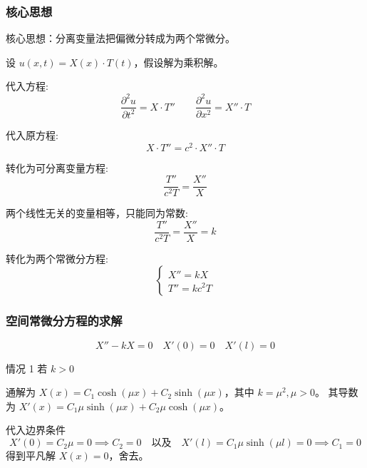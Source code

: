 \documentclass[a4paper, 12pt, oneside]{article} %
\numberwithin{subsection}{section}
\numberwithin{subsubsection}{subsection}
\theoremstyle{plain}
\theoremstyle{definition}
\theoremstyle{remark}
\begin{document}
		\subsubsection{核心思想}
		核心思想：分离变量法把偏微分转成为两个常微分。
		
		设 \(u(x, t) = X(x) \cdot T(t)\)，假设解为乘积解。
		
		代入方程:
		\begin{equation} \label{eq:substitution_neumann}
			\frac{\partial^2 u}{\partial t^2} = X \cdot T'' \qquad \frac{\partial^2 u}{\partial x^2} = X'' \cdot T
		\end{equation}
		
		代入原方程:
		\begin{equation} \label{eq:original_substitution_neumann}
			X \cdot T'' = c^2 \cdot X'' \cdot T
		\end{equation}
		
		转化为可分离变量方程:
		\begin{equation} \label{eq:separation_neumann}
			\frac{T''}{c^2 T} = \frac{X''}{X}
		\end{equation}
		
		两个线性无关的变量相等，只能同为常数:
		\begin{equation} \label{eq:constant_neumann}
			\frac{T''}{c^2 T} = \frac{X''}{X} = k
		\end{equation}
		
		转化为两个常微分方程:
		\begin{equation} \label{eq:ode_neumann}
			\begin{cases}
				X'' = kX \\
				T'' = k c^2 T
			\end{cases}
		\end{equation}
		
		\subsubsection{空间常微分方程的求解}
		\begin{equation}
			X'' - kX = 0 \quad X'(0) = 0 \quad X'(l) = 0
		\end{equation}
		
		情况 1 \quad 若 \(k > 0\)
		
		通解为 \(X(x) = C_1 \cosh(\mu x) + C_2 \sinh(\mu x)\)，其中 \(k = \mu^2, \mu>0\)。
		其导数为 $X'(x) = C_1 \mu \sinh(\mu x) + C_2 \mu \cosh(\mu x)$。
		
		代入边界条件
		\begin{equation}
			X'(0) = C_2 \mu = 0 \implies C_2 = 0 \quad \text{以及} \quad X'(l) = C_1 \mu \sinh(\mu l) = 0 \implies C_1 = 0
		\end{equation}
		得到平凡解 $X(x)=0$，舍去。
		
\end{document}
